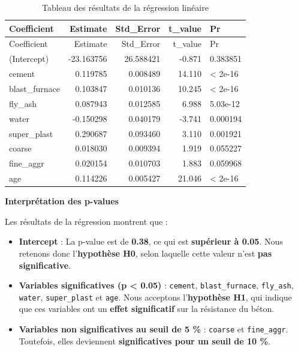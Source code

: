 \documentclass[
  12pt,
]{article}
\providecommand{\tightlist}{%
  \setlength{\itemsep}{0pt}\setlength{\parskip}{0pt}}
\begin{document}
\begin{longtable}[]{@{}lrrrl@{}}
\caption{Tableau des résultats de la régression linéaire}\tabularnewline
\toprule\noalign{}
Coefficient & Estimate & Std\_Error & t\_value & Pr \\
\midrule\noalign{}
\endfirsthead
\toprule\noalign{}
Coefficient & Estimate & Std\_Error & t\_value & Pr \\
\midrule\noalign{}
\endhead
\bottomrule\noalign{}
\endlastfoot
(Intercept) & -23.163756 & 26.588421 & -0.871 & 0.383851 \\
cement & 0.119785 & 0.008489 & 14.110 & \textless{} 2e-16 \\
blast\_furnace & 0.103847 & 0.010136 & 10.245 & \textless{} 2e-16 \\
fly\_ash & 0.087943 & 0.012585 & 6.988 & 5.03e-12 \\
water & -0.150298 & 0.040179 & -3.741 & 0.000194 \\
super\_plast & 0.290687 & 0.093460 & 3.110 & 0.001921 \\
coarse & 0.018030 & 0.009394 & 1.919 & 0.055227 \\
fine\_aggr & 0.020154 & 0.010703 & 1.883 & 0.059968 \\
age & 0.114226 & 0.005427 & 21.046 & \textless{} 2e-16 \\
\end{longtable}

\textbf{Interprétation des p-values}

Les résultats de la régression montrent que :

\begin{itemize}
\tightlist
\item
  \textbf{Intercept} : La p-value est de \textbf{0.38}, ce qui est
  \textbf{supérieur à 0.05}. Nous retenons donc l'\textbf{hypothèse H0},
  selon laquelle cette valeur n'est \textbf{pas significative}.
\item
  \textbf{Variables significatives (p \textless{} 0.05)} :
  \texttt{cement}, \texttt{blast\_furnace}, \texttt{fly\_ash},
  \texttt{water}, \texttt{super\_plast} et \texttt{age}. Nous acceptons
  l'\textbf{hypothèse H1}, qui indique que ces variables ont un
  \textbf{effet significatif} sur la résistance du béton.
\item
  \textbf{Variables non significatives au seuil de 5 \%} :
  \texttt{coarse} et \texttt{fine\_aggr}. Toutefois, elles deviennent
  \textbf{significatives pour un seuil de 10 \%}.
\end{itemize}
\end{document}
